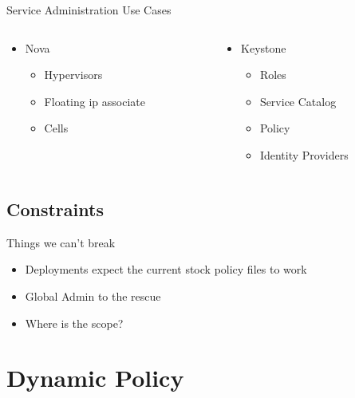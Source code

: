 \documentclass{beamer}
\begin{document}
\begin{frame}{Service Administration Use Cases}
  \begin{columns}[t,onlytextwidth]

    \begin{column}{.5\textwidth}
      \begin{itemize}
      \item Nova
        \begin{itemize}
        \item Hypervisors
        \item Floating ip associate
        \item Cells
        \end{itemize}
      \end{itemize}
    \end{column}

    \begin{column}{.5\textwidth}
      \begin{itemize}
      \item Keystone
        \begin{itemize}
        \item Roles
        \item Service Catalog 
        \item Policy
        \item Identity Providers
        \end{itemize}
      \end{itemize}
    \end{column}
  \end{columns}
\end{frame}

\subsection {Constraints}

\begin{frame}{Things we can't break}
  \begin{itemize}
  \item Deployments expect the current stock policy files to work
  \item Global Admin to the rescue
  \item Where is the scope?
  \end{itemize}
\end{frame}




\section {Dynamic Policy}
\end{document}
